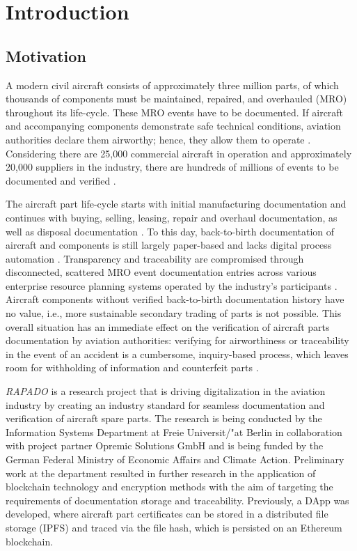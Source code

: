 \chapter{Introduction}
\citet{semesterproject}
\section{Motivation}
A modern civil aircraft consists of approximately three million parts, of which thousands of components must be maintained, repaired, and overhauled (MRO) throughout its life-cycle. These MRO events have to be documented. If aircraft and accompanying components demonstrate safe technical conditions, aviation authorities declare them airworthy; hence, they allow them to operate \citep{FornaconFrank}. Considering there are 25,000 commercial aircraft in operation and approximately 20,000 suppliers in the industry, there are hundreds of millions of events to be documented and verified \citep{mroBCservices1}.

The aircraft part life-cycle starts with initial manufacturing documentation and continues with buying, selling, leasing, repair and overhaul documentation, as well as disposal documentation \citep{FornaconFrank, mroBCservices}. To this day, back-to-birth documentation of aircraft and components is still largely paper-based and lacks digital process automation \citep{efthymiou}. Transparency and traceability are compromised through disconnected, scattered MRO event documentation entries across various enterprise resource planning systems operated by the industry's participants \citep{FornaconFrank, mroBCservices1}. Aircraft components without verified back-to-birth documentation history have no value, i.e., more sustainable secondary trading of parts is not possible. This overall situation has an immediate effect on the verification of aircraft parts documentation by aviation authorities: verifying for airworthiness or traceability in the event of an accident is a cumbersome, inquiry-based process, which leaves room for withholding of information and counterfeit parts \citep{planecrash, efthymiou}.

\textit{RAPADO} is a research project that is driving digitalization in the aviation industry by creating an industry standard for seamless documentation and verification of aircraft spare parts. The research is being conducted by the Information Systems Department at Freie Universit{/"a}t Berlin in collaboration with project partner Opremic Solutions GmbH and is being funded by the German Federal Ministry of Economic Affairs and Climate Action. Preliminary work at the department resulted in further research in the application of blockchain technology and encryption methods with the aim of targeting the requirements of documentation storage and traceability. Previously, a DApp was developed, where aircraft part certificates can be stored in a distributed file storage (IPFS) and traced via the file hash, which is persisted on an Ethereum blockchain.

